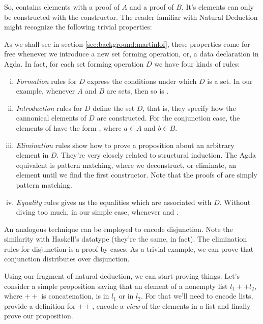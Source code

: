 
So,  contains elements with a proof of $A$ and a proof of $B$. It's elements
can only be constructed with the \inlagda{<\_,\_>} constructor. The reader familiar with Natural Deduction
might recognize the following trivial properties:


As we shall see in section \ref{sec:background:martinlof}, these properties come for free whenever we introduce 
a new set forming operation, or, a data declaration in Agda. In fact, for each set forming operation $D$
we have four kinds of rules:
\begin{enumerate}[i)]
  \item \emph{Formation} rules for $D$ express the conditions under which $D$ is a set.
        In our example, whenever $A$ and $B$ are sets, then so is .
  \item \emph{Introduction} rules for $D$ define the set $D$, that is, they specify how the
        cannonical elements of $D$ are constructed. For the conjunction case, 
        the elements of  have the form , where $a \in A$
        and $b \in B$. 
  \item \emph{Elimination} rules show how to prove a proposition about an arbitrary element in $D$.
        They're very closely related to structural induction. The Agda equivalent is pattern matching,
        where we deconstruct, or eliminate, an element until we find the first constructor. Note that
        the proofs of  are simply pattern matching.
  \item \emph{Equality} rules gives us the equalities which are associated with $D$. Without diving
        too much, in our simple case,  whenever 
        and .
\end{enumerate}

An analogous technique can be employed to encode disjunction. Note the similarity with
Haskell's  datatype (they're the same, in fact). The elimination rules for
disjunction is a proof by cases. As a trivial example, we can prove that conjunction distributes
over disjunction.


Using our fragment of natural deduction, we can start proving things. Let's consider a simple
proposition saying that an element of a nonempty list $l_1 ++ l_2$, where $++$ is concatenation, is
in $l_1$ or in $l_2$. For that we'll need to encode lists, provide a definition for $++$,
encode a \emph{view} of the elements in a list and finally prove our proposition.

